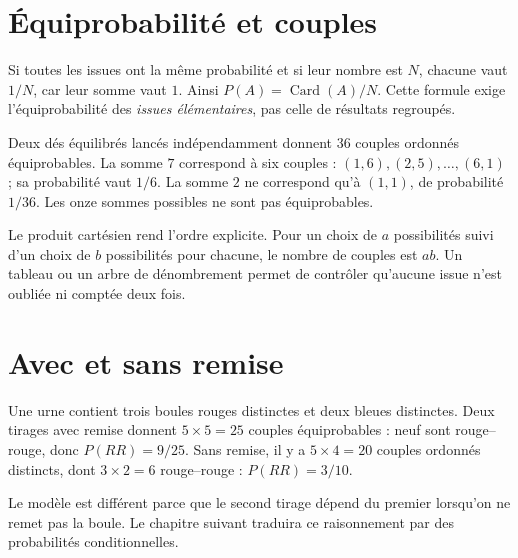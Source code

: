 \documentclass[../cours_2de.tex]{subfiles}
\begin{document}
\section{Équiprobabilité et couples}
Si toutes les issues ont la même probabilité et si leur nombre est $N$, chacune vaut $1/N$, car leur somme vaut $1$.
Ainsi $P(A)=\operatorname{Card}(A)/N$.
Cette formule exige l'équiprobabilité des \emph{issues élémentaires}, pas celle de résultats regroupés.
\begin{exemple}
Deux dés équilibrés lancés indépendamment donnent $36$ couples ordonnés équiprobables.
La somme $7$ correspond à six couples : $(1,6),(2,5),\ldots,(6,1)$ ; sa probabilité vaut $1/6$.
La somme $2$ ne correspond qu'à $(1,1)$, de probabilité $1/36$.
Les onze sommes possibles ne sont pas équiprobables.
\end{exemple}
Le produit cartésien rend l'ordre explicite. Pour un choix de $a$ possibilités suivi d'un choix de $b$ possibilités pour chacune, le nombre de couples est $ab$.
Un tableau ou un arbre de dénombrement permet de contrôler qu'aucune issue n'est oubliée ni comptée deux fois.
\section{Avec et sans remise}
\begin{exemple}
Une urne contient trois boules rouges distinctes et deux bleues distinctes.
Deux tirages avec remise donnent $5\times5=25$ couples équiprobables : neuf sont rouge--rouge, donc $P(RR)=9/25$.
Sans remise, il y a $5\times4=20$ couples ordonnés distincts, dont $3\times2=6$ rouge--rouge : $P(RR)=3/10$.
\end{exemple}
Le modèle est différent parce que le second tirage dépend du premier lorsqu'on ne remet pas la boule. Le chapitre suivant traduira ce raisonnement par des probabilités conditionnelles.
\end{document}
